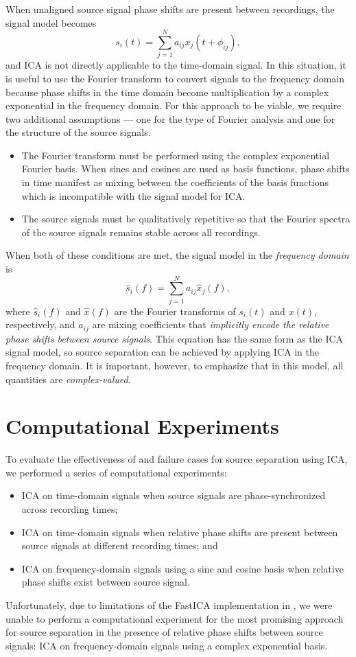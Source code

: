 \documentclass[10pt]{article}
\begin{document}
When unaligned source signal phase shifts are present between recordings, the signal model
becomes
$$
s_i(t) = \sum_{j=1}^N a_{ij} x_j(t + \phi_{ij}),
$$
and ICA is not directly applicable to the time-domain signal. In this situation, it is
useful to use the Fourier transform to convert signals to the frequency domain because
phase shifts in the time domain become multiplication by a complex exponential in the
frequency domain. For this approach to be viable, we require two additional assumptions
--- one for the type of Fourier analysis and one for the structure of the source signals.
\begin{itemize}
    \item The Fourier transform must be performed using the complex exponential Fourier
        basis. When sines and cosines are used as basis functions, phase shifts in time
        manifest as mixing between the coefficients of the basis functions which is
        incompatible with the signal model for ICA.

    \item The source signals must be qualitatively repetitive so that the Fourier
        spectra of the source signals remains stable across all recordings.
\end{itemize}
When both of these conditions are met, the signal model in the \emph{frequency domain} is
$$
\hat{s}_i(f) = \sum_{j=1}^N a_{ij} \hat{x}_j(f),
$$
where $\hat{s}_i(f)$ and $\hat{x}(f)$ are the Fourier transforms of $s_i(t)$ and $x(t)$,
respectively, and $a_{ij}$ are mixing coefficients that \emph{implicitly encode the
relative phase shifts between source signals}. This equation has the same form as the ICA
signal model, so source separation can be achieved by applying ICA in the frequency domain.
It is important, however, to emphasize that in this model, all quantities are
\emph{complex-valued}.

\section{Computational Experiments}

To evaluate the effectiveness of and failure cases for source separation using ICA, we
performed a series of computational experiments:
\begin{itemize}
    \item ICA on time-domain signals when source signals are phase-synchronized across
        recording times;
    \item ICA on time-domain signals when relative phase shifts are present between source
        signals at different recording times; and
    \item ICA on frequency-domain signals using a sine and cosine basis when relative phase
        shifts exist between source signal.
\end{itemize}
Unfortunately, due to limitations of the FastICA implementation in , we
were unable to perform a computational experiment for the most promising approach for
source separation in the presence of relative phase shifts between source signals: ICA on
frequency-domain signals using a complex exponential basis.
\end{document}

